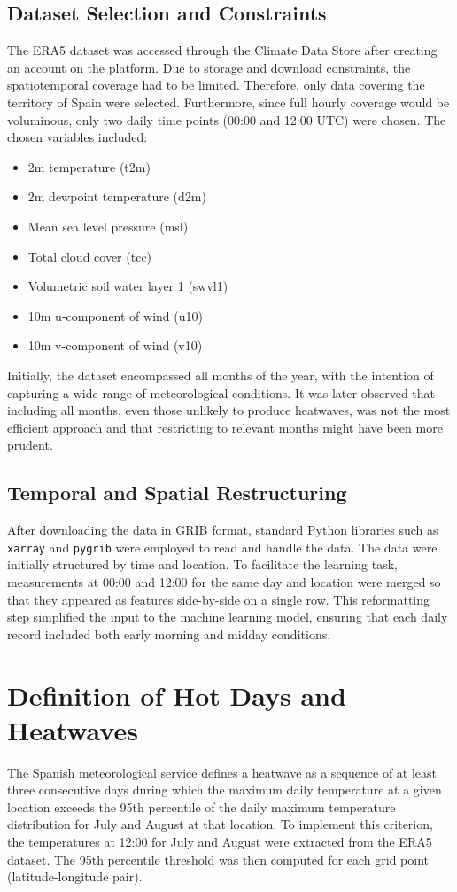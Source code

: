\documentclass[12pt,a4paper]{article}
\begin{document}
\subsection{Dataset Selection and Constraints}
The ERA5 dataset was accessed through the Climate Data Store after creating an account on the platform. Due to storage and download constraints, the spatiotemporal coverage had to be limited. Therefore, only data covering the territory of Spain were selected. Furthermore, since full hourly coverage would be voluminous, only two daily time points (00:00 and 12:00 UTC) were chosen. The chosen variables included:
\begin{itemize}
    \item 2m temperature (t2m)
    \item 2m dewpoint temperature (d2m)
    \item Mean sea level pressure (msl)
    \item Total cloud cover (tcc)
    \item Volumetric soil water layer 1 (swvl1)
    \item 10m u-component of wind (u10)
    \item 10m v-component of wind (v10)
\end{itemize}

Initially, the dataset encompassed all months of the year, with the intention of capturing a wide range of meteorological conditions. It was later observed that including all months, even those unlikely to produce heatwaves, was not the most efficient approach and that restricting to relevant months might have been more prudent.

\subsection{Temporal and Spatial Restructuring}
After downloading the data in GRIB format, standard Python libraries such as \texttt{xarray} and \texttt{pygrib} were employed to read and handle the data. The data were initially structured by time and location. To facilitate the learning task, measurements at 00:00 and 12:00 for the same day and location were merged so that they appeared as features side-by-side on a single row. This reformatting step simplified the input to the machine learning model, ensuring that each daily record included both early morning and midday conditions.

\section{Definition of Hot Days and Heatwaves}
The Spanish meteorological service defines a heatwave as a sequence of at least three consecutive days during which the maximum daily temperature at a given location exceeds the 95th percentile of the daily maximum temperature distribution for July and August at that location. To implement this criterion, the temperatures at 12:00 for July and August were extracted from the ERA5 dataset. The 95th percentile threshold was then computed for each grid point (latitude-longitude pair).
\end{document}

